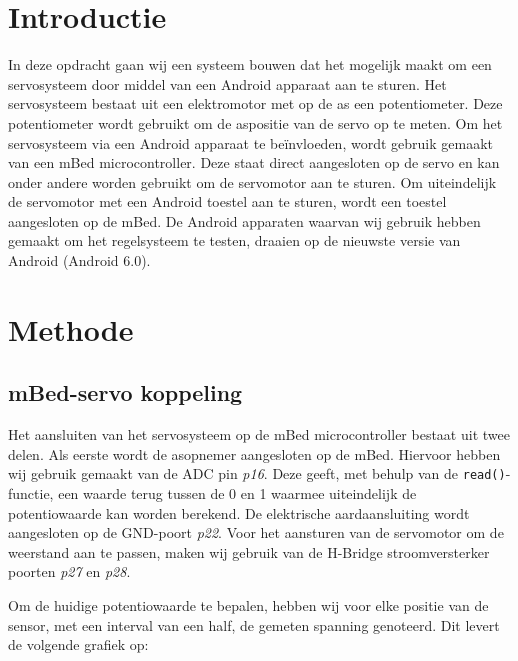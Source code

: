 \documentclass[a4paper,12pt]{article}
\begin{document}

\section{Introductie}
In deze opdracht gaan wij een systeem bouwen dat het mogelijk maakt om een servosysteem door middel van een Android apparaat aan te sturen. Het servosysteem bestaat uit een elektromotor met op de as een potentiometer. Deze potentiometer wordt gebruikt om de aspositie van de servo op te meten. Om het servosysteem via een Android apparaat te be\"{i}nvloeden, wordt gebruik gemaakt van een mBed microcontroller. Deze staat direct aangesloten op de servo en kan onder andere worden gebruikt om de servomotor aan te sturen. Om uiteindelijk de servomotor met een Android toestel aan te sturen, wordt een toestel aangesloten op de mBed. De Android apparaten waarvan wij gebruik hebben gemaakt om het regelsysteem te testen, draaien op de nieuwste versie van Android (Android 6.0).  

\section{Methode}
\subsection{mBed-servo koppeling}
Het aansluiten van het servosysteem op de mBed microcontroller bestaat uit twee delen. Als eerste wordt de asopnemer aangesloten op de mBed. Hiervoor hebben wij gebruik gemaakt van de ADC pin \textit{p16}. Deze geeft, met behulp van de \texttt{read()}-functie, een waarde terug tussen de 0 en 1 waarmee uiteindelijk de potentiowaarde kan worden berekend. De elektrische aardaansluiting wordt aangesloten op de GND-poort \textit{p22}. Voor het aansturen van de servomotor om de weerstand aan te passen, maken wij gebruik van de H-Bridge stroomversterker poorten \textit{p27} en \textit{p28}. 

Om de huidige potentiowaarde te bepalen, hebben wij voor elke positie van de sensor, met een interval van een half, de gemeten spanning genoteerd. Dit levert de volgende grafiek op:
\end{document}

